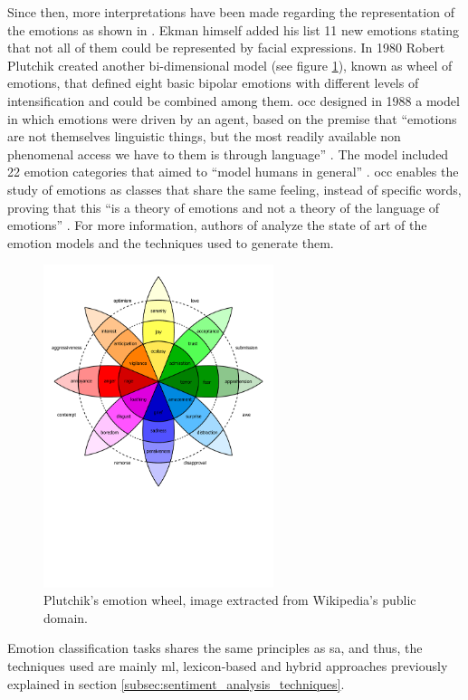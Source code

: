 Since then, more interpretations have been made regarding the representation of the emotions as shown in \cite{cambria2012hourglass}. Ekman himself added his list 11 new emotions stating that not all of them could be represented by facial expressions. In 1980 Robert Plutchik created another bi-dimensional model (see figure \ref{fig:plutchik-wheeel}), known as wheel of emotions, that defined eight basic bipolar emotions with different levels of intensification and could be combined among them. \acrfull{occ} designed in 1988 a model in which emotions were driven by an agent, based on the premise that ``emotions are not themselves linguistic things, but the most readily available non phenomenal access we have to them is through language'' \cite{binali2010computational}. The model included 22 emotion categories that aimed to ``model humans in general'' \cite{binali2010computational}. \acrshort{occ} enables the study of emotions as classes that share the same feeling, instead of specific words, proving that this ``is a theory of emotions and not a theory of the language of emotions'' \cite{binali2010computational}. For more information, authors of \cite{binali2012emotion} analyze the state of art of the emotion models and the techniques used to generate them.

\begin{figure}[!htp]
  \center
  \includegraphics[width=0.6\textwidth]{figures/plutchik-wheel}
  \caption{Plutchik's emotion wheel, image extracted from Wikipedia's public domain.}
  \label{fig:plutchik-wheeel}
\end{figure}

Emotion classification tasks shares the same principles as \acrshort{sa}, and thus, the techniques used are mainly \acrshort{ml}, lexicon-based and hybrid approaches previously explained in section \ref{subsec:sentiment_analysis_techniques}.